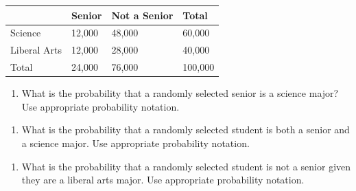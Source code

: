 \documentclass[
]{report}
\providecommand{\tightlist}{%
  \setlength{\itemsep}{0pt}\setlength{\parskip}{0pt}}
\begin{document}
\begin{longtable}[]{@{}llll@{}}
\toprule()
& Senior & Not a Senior & Total \\
\midrule()
\endhead
Science & 12,000 & 48,000 & 60,000 \\
Liberal Arts & 12,000 & 28,000 & 40,000 \\
Total & 24,000 & 76,000 & 100,000 \\
\bottomrule()
\end{longtable}

\begin{enumerate}
\def\labelenumi{\alph{enumi}.}
\tightlist
\item
  What is the probability that a randomly selected senior is a science major? Use appropriate probability notation.
\end{enumerate}

\vspace{0.35in}

\begin{enumerate}
\def\labelenumi{\alph{enumi}.}
\setcounter{enumi}{1}
\tightlist
\item
  What is the probability that a randomly selected student is both a senior and a science major. Use appropriate probability notation.
\end{enumerate}

\vspace{0.35in}

\begin{enumerate}
\def\labelenumi{\alph{enumi}.}
\setcounter{enumi}{2}
\tightlist
\item
  What is the probability that a randomly selected student is not a senior given they are a liberal arts major. Use appropriate probability notation.
\end{enumerate}

\vspace{0.35in}
\end{document}
